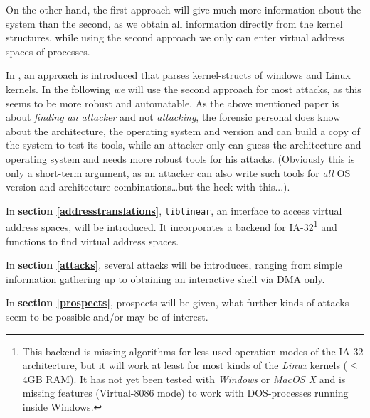 On the other hand, the first approach will give much more information about the
system than the second, as we obtain all information directly from the kernel
structures, while using the second approach we only can enter virtual address
spaces of processes.

In \cite{finding_digital_evidence_in_physical_memory:2006}, an approach is
introduced that parses kernel-structs of windows and Linux kernels. In the
following \emph{we} will use the second approach for most attacks, as this seems
to be more robust and automatable.  As the above mentioned paper is about
\emph{finding an attacker} and not \emph{attacking}, the forensic personal does
know about the architecture, the operating system and version and can build a
copy of the system to test its tools, while an attacker only can guess the
architecture and operating system and needs more robust tools for his attacks.
(Obviously this is only a short-term argument, as an attacker can also write
such tools for \emph{all} OS version and architecture combinations\ldots but the
heck with this...).



In \textbf{section \ref{addresstranslations}}, \texttt{liblinear}, an interface
to access virtual address spaces, will be introduced. It incorporates a backend
for IA-32\footnote{This backend is missing algorithms for less-used
operation-modes of the IA-32 architecture, but it will work at least for most
kinds of the \emph{Linux} kernels ($\leq$ 4GB RAM). It has not yet been tested
with \emph{Windows} or \emph{MacOS X} and is missing features (Virtual-8086
mode) to work with DOS-processes running inside Windows.} and functions to find
virtual address spaces.



In \textbf{section \ref{attacks}}, several attacks will be introduces, ranging
from simple information gathering up to obtaining an interactive shell via DMA
only. 



In \textbf{section \ref{prospects}}, prospects will be given, what further kinds
of attacks seem to be possible and/or may be of interest.

